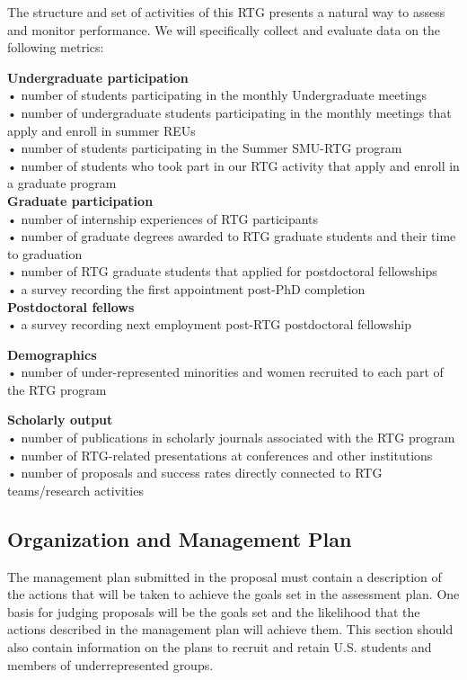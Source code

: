 \documentclass[11pt]{article}
\begin{document}
The structure and set of activities of this RTG presents a natural way to assess and monitor performance.
We will specifically collect and evaluate data on the following metrics:

\textbf{Undergraduate participation}\\
• number of students participating in the monthly Undergraduate meetings\\
• number of undergraduate students participating in the monthly meetings that apply and enroll in summer REUs\\
• number of students participating in the Summer SMU-RTG program\\
• number of students who took part in our RTG activity that apply and enroll in a graduate program\\

\textbf{Graduate participation}\\
• number of internship experiences of RTG participants\\
• number of graduate degrees awarded to RTG graduate students and their time to graduation\\
• number of RTG graduate students that applied for postdoctoral fellowships\\
• a survey recording the first appointment post-PhD completion\\

\textbf{Postdoctoral fellows}\\
• a survey recording next employment post-RTG postdoctoral fellowship

\textbf{Demographics}\\
• number of under-represented minorities and women recruited to each part of the RTG program

\textbf{Scholarly output}\\
• number of publications in scholarly journals associated with the RTG program\\
• number of RTG-related presentations at conferences and other institutions\\
• number of proposals and success rates directly connected to RTG teams/research activities

 


\subsection{Organization and Management Plan }
 
The management plan submitted in the proposal must contain a description of the actions that will be taken to achieve the goals set in the assessment plan. One basis for judging proposals will be the goals set and the likelihood that the actions described in the management plan will achieve them. This section should also contain information on the plans to recruit and retain U.S. students and members of underrepresented groups. 
 
\end{document}
